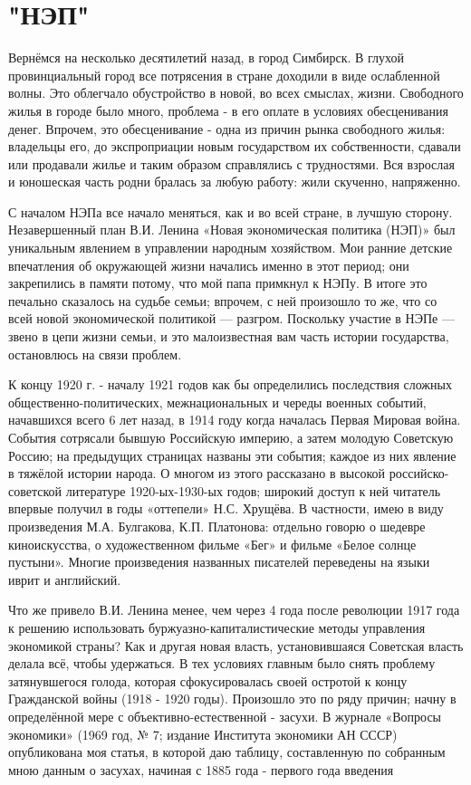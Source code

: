 \label{071-2}
\chapter*{"НЭП"}
Вернёмся на несколько десятилетий назад, в город Симбирск. В глухой провинциальный город все потрясения \nolinebreak
{}\nolinebreak
в стране доходили в виде ослабленной волны. Это облегчало обустройство в новой, во всех смыслах, жизни. Свободного жилья в городе было много, проблема - в его оплате в условиях обесценивания денег. Впрочем, это обесценивание - одна из причин рынка свободного жилья: владельцы его, до 
экспроприации новым государством их собственности, сдавали или продавали жилье и таким образом справлялись с трудностями. Вся взрослая и юношеская часть родни бралась за любую работу: жили скученно, напряженно. 

С началом НЭПа все начало меняться, как и во всей стране, в лучшую сторону. Незавершенный план В.И. Ленина «Новая экономическая политика (НЭП)» был уникальным явлением в управлении
\nolinebreak
{}
\label{073-1}
народным хозяйством. Мои ранние детские впечатления об окружающей жизни начались именно в этот период; они закрепились в памяти потому, что мой папа примкнул к НЭПу. В итоге это печально сказалось на судьбе семьи; впрочем, с ней произошло то же, что со всей новой экономической политикой — разгром. Поскольку участие в НЭПе — звено в цепи жизни семьи, и это малоизвестная вам часть истории государства, остановлюсь на связи проблем. 

К концу 1920 г. - началу 1921 годов как бы определились последствия сложных общественно-политических, межнациональных и череды военных событий, начавшихся всего 6 лет назад, в 1914 году когда началась Первая Мировая война.
\nolinebreak
{}
\label{074-1}
События сотрясали бывшую Российскую империю, а затем молодую Советскую Россию; на предыдущих страницах названы эти события; каждое из них явление в тяжёлой истории народа. О многом из этого рассказано в высокой российско-советской литературе 1920-ых-1930-ых годов; широкий доступ к ней читатель впервые получил в годы «оттепели» Н.С. Хрущёва. В частности, имею в виду произведения М.А. Булгакова, К.П. Платонова: отдельно говорю о шедевре киноискусства, о художественном фильме «Бег» и фильме «Белое солнце пустыни». Многие произведения названных писателей переведены на языки иврит и английский. 

Что же привело В.И. Ленина менее, чем через 4 года после
\label{075-1}
революции 1917 года к решению использовать буржуазно-капиталистические методы управления экономикой страны? Как и другая новая власть, установившаяся Советская власть делала всё, чтобы удержаться. В тех условиях главным было снять проблему затянувшегося голода, которая сфокусировалась своей остротой к концу Гражданской войны (1918 - 1920 годы). Произошло это по ряду причин; начну в определённой мере с объективно-естественной - засухи. В журнале «Вопросы экономики» (1969 год, № 7; издание Института экономики АН СССР) опубликована моя статья, в которой даю таблицу, составленную по собранным мною данным о засухах, начиная с 1885 года - первого года введения 

